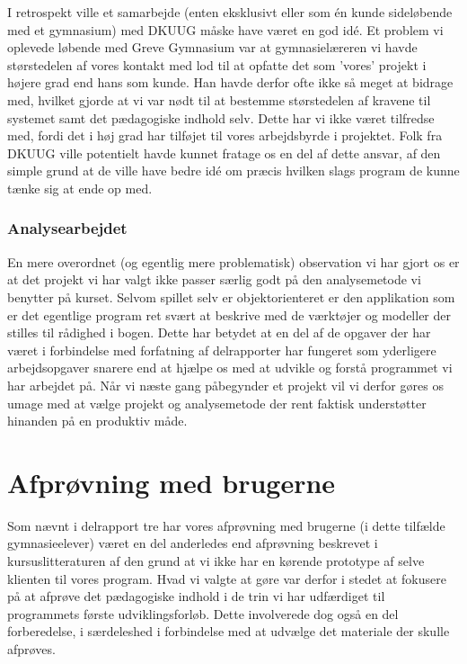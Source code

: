\documentclass[10pt,a4paper,danish]{article}
\begin{document}
I retrospekt ville et samarbejde (enten eksklusivt eller som én kunde sideløbende med et gymnasium) med 
DKUUG måske have været en god idé. Et problem vi oplevede løbende med Greve Gymnasium var at gymnasielæreren
vi havde størstedelen af vores kontakt med lod til at opfatte det som 'vores' projekt i højere grad end 
hans som kunde. Han havde derfor ofte ikke så meget at bidrage med, hvilket gjorde at vi var nødt til at
bestemme størstedelen af kravene til systemet samt det pædagogiske indhold selv. Dette har vi ikke været tilfredse
med, fordi det i høj grad har tilføjet til vores arbejdsbyrde i projektet. Folk fra DKUUG ville potentielt
havde kunnet fratage os en del af dette ansvar, af den simple grund at de ville have bedre idé om præcis
hvilken slags program de kunne tænke sig at ende op med. 

\subsubsection{Analysearbejdet}
En mere overordnet (og egentlig mere problematisk) observation vi har gjort os er at det projekt vi 
har valgt ikke passer særlig godt på den analysemetode vi benytter på kurset. Selvom spillet selv 
er objektorienteret er den applikation som er det egentlige program ret svært at beskrive med de 
værktøjer og modeller der stilles til rådighed i bogen. Dette har betydet at en del af de opgaver der
har været i forbindelse med forfatning af delrapporter har fungeret som yderligere arbejdsopgaver
snarere end at hjælpe os med at udvikle og forstå programmet vi har arbejdet på. Når vi næste gang
påbegynder et projekt vil vi derfor gøres os umage med at vælge projekt og analysemetode der rent 
faktisk understøtter hinanden på en produktiv måde. 

\section{Afprøvning med brugerne}
Som nævnt i delrapport tre har vores afprøvning med brugerne (i dette tilfælde gymnasieelever)
været en del anderledes end afprøvning beskrevet i kursuslitteraturen af den grund at vi ikke 
har en kørende prototype af selve klienten til vores program. Hvad vi valgte at gøre var 
derfor i stedet at fokusere på at afprøve det pædagogiske indhold i de trin vi har udfærdiget
til programmets første udviklingsforløb. Dette involverede dog også en del forberedelse, i 
særdeleshed i forbindelse med at udvælge det materiale der skulle afprøves. 
\end{document}
